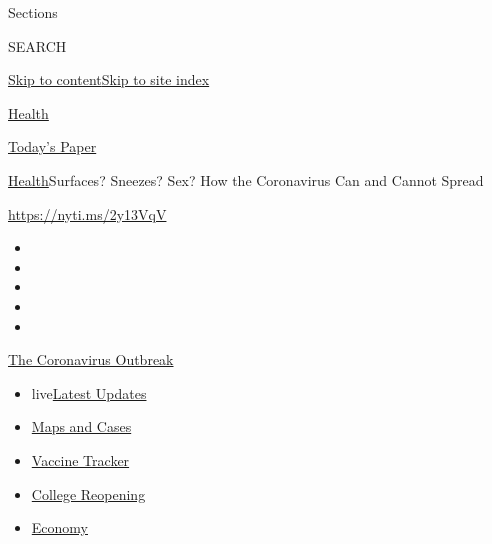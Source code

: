 Sections

SEARCH

\protect\hyperlink{site-content}{Skip to
content}\protect\hyperlink{site-index}{Skip to site index}

\href{https://www.nytimes3xbfgragh.onion/section/health}{Health}

\href{https://myaccount.nytimes3xbfgragh.onion/auth/login?response_type=cookie\&client_id=vi}{}

\href{https://www.nytimes3xbfgragh.onion/section/todayspaper}{Today's
Paper}

\href{/section/health}{Health}\textbar{}Surfaces? Sneezes? Sex? How the
Coronavirus Can and Cannot Spread

\url{https://nyti.ms/2y13VqV}

\begin{itemize}
\item
\item
\item
\item
\item
\end{itemize}

\href{https://www.nytimes3xbfgragh.onion/news-event/coronavirus?action=click\&pgtype=Article\&state=default\&region=TOP_BANNER\&context=storylines_menu}{The
Coronavirus Outbreak}

\begin{itemize}
\tightlist
\item
  live\href{https://www.nytimes3xbfgragh.onion/2020/08/04/world/coronavirus-covid-19.html?action=click\&pgtype=Article\&state=default\&region=TOP_BANNER\&context=storylines_menu}{Latest
  Updates}
\item
  \href{https://www.nytimes3xbfgragh.onion/interactive/2020/us/coronavirus-us-cases.html?action=click\&pgtype=Article\&state=default\&region=TOP_BANNER\&context=storylines_menu}{Maps
  and Cases}
\item
  \href{https://www.nytimes3xbfgragh.onion/interactive/2020/science/coronavirus-vaccine-tracker.html?action=click\&pgtype=Article\&state=default\&region=TOP_BANNER\&context=storylines_menu}{Vaccine
  Tracker}
\item
  \href{https://www.nytimes3xbfgragh.onion/2020/08/02/us/covid-college-reopening.html?action=click\&pgtype=Article\&state=default\&region=TOP_BANNER\&context=storylines_menu}{College
  Reopening}
\item
  \href{https://www.nytimes3xbfgragh.onion/live/2020/08/03/business/stock-market-today-coronavirus?action=click\&pgtype=Article\&state=default\&region=TOP_BANNER\&context=storylines_menu}{Economy}
\end{itemize}

